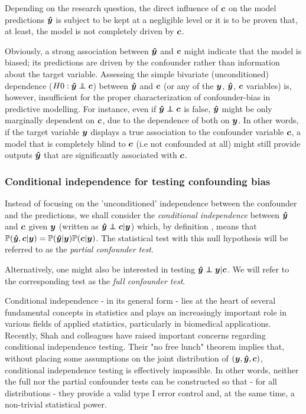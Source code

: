 \documentclass{article}
\begin{document}
Depending on the research question, the direct influence of $\boldsymbol{c}$ on the model predictions $\boldsymbol{\hat{y}}$ is subject to be kept at a negligible level or it is to be proven that, at least, the model is not completely driven by $\boldsymbol{c}$.

Obviously, a strong association between $\boldsymbol{\hat{y}}$ and $\boldsymbol{c}$ might indicate that the model is biased; its predictions are driven by the confounder rather than information about the target variable.
Assessing the simple bivariate (unconditioned) dependence ($H0: \yhat \independent \c$) between $\boldsymbol{\hat{y}}$ and $\boldsymbol{c}$ (or any of the $\boldsymbol{y}$, $\boldsymbol{\hat{y}}$, $\boldsymbol{c}$ variables) is, however, insufficient for the proper characterization of confounder-bias in predictive modelling.
For instance, even if $\yhat \independent \c$ is false, $\boldsymbol{\hat{y}}$ might be only marginally dependent on $\boldsymbol{c}$, due to the dependence of both on $\boldsymbol{y}$. In other words, if the target variable $\boldsymbol{y}$ displays a true association to the confounder variable $\boldsymbol{c}$, a model that is completely blind to $\boldsymbol{c}$ (i.e not confounded at all) might still provide outputs $\boldsymbol{\hat{y}}$ that are significantly associated with $\boldsymbol{c}$.

\subsubsection*{Conditional independence for testing confounding bias}

Instead of focusing on the 'unconditioned' independence between the confounder and the predictions, we shall consider the \emph{conditional independence} between $\boldsymbol{\hat{y}}$ and $\boldsymbol{c}$ given $\boldsymbol{y}$ (written as $\yhat \independent \c | \y$) which, by definition \citep{dawid1979conditional}, means that $\mathbb{P}(\boldsymbol{\hat{y}}, \boldsymbol{c}|\boldsymbol{y}) = \mathbb{P}(\boldsymbol{\hat{y}}|\boldsymbol{y})\mathbb{P}(\boldsymbol{c}|\boldsymbol{y})$. The statistical test with this null hypothesis will be referred to as the \emph{partial confounder test}.

Alternatively, one might also be interested in testing $\yhat \independent \y | \c$. We will refer to the corresponding test as the \emph{full confounder test}.

 Conditional independence - in its general form - lies at the heart of several fundamental concepts in statistics and  plays an increasingly important role in various fields of applied statistics, particularly in biomedical applications\citep{spirtes2000causation, fiedler2011mediation, peters2016causal, candes2016panning}. Recently, Shah and colleagues\cite{shah2020hardness} have raised important concerns regarding conditional independence testing.
 Their "no free lunch" theorem implies that, without placing some assumptions on the joint distribution of $(\boldsymbol{y}, \boldsymbol{\hat{y}}, \boldsymbol{c})$, conditional independence testing is effectively impossible. In other words, neither the full nor the partial confounder tests can be constructed so that - for all distributions - they provide a valid type I error control and, at the same time, a non-trivial statistical power.
\end{document}
